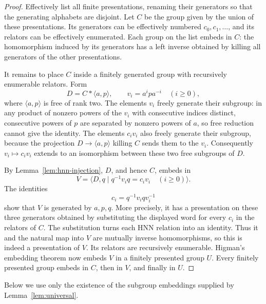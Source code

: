 \begin{proof}
Effectively list all finite presentations, renaming their generators
so that the generating alphabets are disjoint.  Let $C$ be the group
given by the union of these presentations.  Its generators can be
effectively numbered $c_0,c_1,\ldots$, and its relators can be
effectively enumerated.  Each group on the list embeds in $C$: the
homomorphism induced by its generators has a left inverse obtained by
killing all generators of the other presentations.

It remains to place $C$ inside a finitely generated group with
recursively enumerable relators.  Form
\[
 D=C*\langle a,p\rangle,
 \qquad v_i=a^ipa^{-i}\quad(i\geq0),
\]
where $\langle a,p\rangle$ is free of rank two.  The elements $v_i$
freely generate their subgroup: in any product of nonzero powers of
the $v_i$ with consecutive indices distinct, consecutive powers of
$p$ are separated by nonzero powers of $a$, so free reduction cannot
give the identity.  The elements $c_iv_i$ also freely generate their
subgroup, because the projection $D\to\langle a,p\rangle$ killing $C$
sends them to the $v_i$.  Consequently $v_i\mapsto c_iv_i$ extends to
an isomorphism between these two free subgroups of $D$.

By Lemma~\ref{lem:hnn-injection}, $D$, and hence $C$, embeds in
\[
 V=\bigl\langle D,q\mid q^{-1}v_iq=c_iv_i\quad(i\geq0)\bigr\rangle.
\]
The identities
\[
 c_i=q^{-1}v_iqv_i^{-1}
\]
show that $V$ is generated by $a,p,q$.  More precisely, it has a
presentation on these three generators obtained by substituting the
displayed word for every $c_i$ in the relators of $C$.  The substitution
turns each HNN relation into an identity.  Thus it and the natural map
into $V$ are mutually inverse homomorphisms, so this is indeed a
presentation of $V$.  Its relators are recursively
enumerable.  Higman's embedding theorem now embeds $V$ in a finitely
presented group $U$.  Every finitely presented group embeds in $C$,
then in $V$, and finally in $U$.
\end{proof}

Below we use only the existence of the subgroup embeddings supplied by
Lemma~\ref{lem:universal}.
